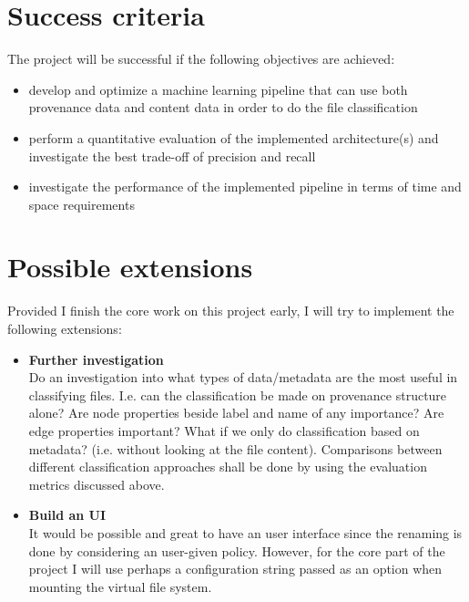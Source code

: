 \section*{Success criteria}

The project will be successful if the following objectives are achieved: \\

\begin{itemize}

  \item develop and optimize a machine learning pipeline that can use both provenance data and content data in order to do the file classification

  \item perform a quantitative evaluation of the implemented architecture(s) and investigate the best trade-off of precision and recall

  \item investigate the performance of the implemented pipeline in terms of time and space requirements \\


\end{itemize}


\section*{Possible extensions}

Provided I finish the core work on this project early, I will try to implement the following extensions: \\

\begin{itemize}
  \item \textbf{Further investigation} \\
        Do an investigation into what types of data/metadata are the most useful in classifying files. I.e. can the classification be made on provenance structure alone? Are node properties beside label and name of any importance? Are edge properties important? What if we only do classification based on metadata? (i.e. without looking at the file content). Comparisons between different classification approaches shall be done by using the evaluation metrics discussed above. \\

  \item \textbf{Build an UI} \\
        It would be possible and great to have an user interface since the renaming is done by considering an user-given policy. However, for the core part of the project I will use perhaps a configuration string passed as an option when mounting the virtual file system.
\end{itemize}


